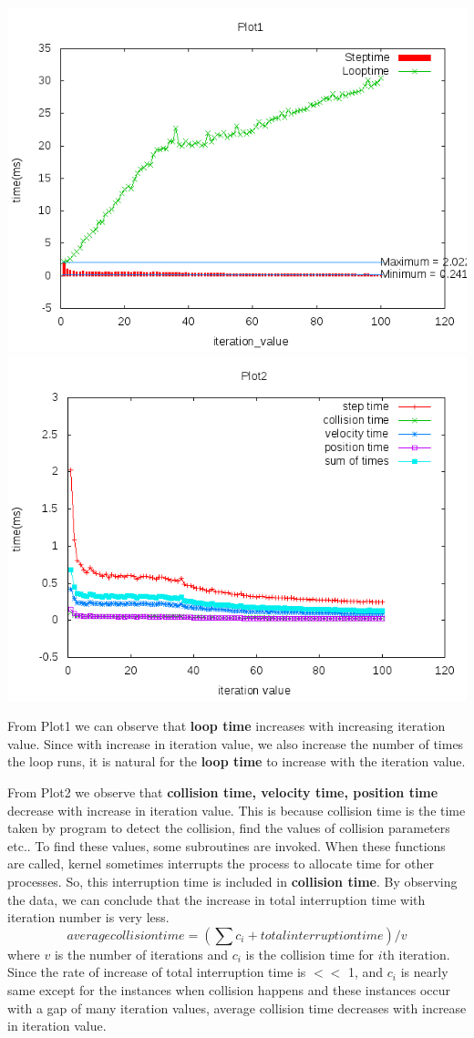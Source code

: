 \documentclass[11pt]{article}
\begin{document}
\includegraphics[scale=0.5]{g28_plot01.png}
\includegraphics[scale=0.5]{g28_plot02.png}

From Plot1 we can observe that {\bf loop time} increases with increasing iteration value. Since with increase in iteration value, we also increase the number of times the loop runs, it is natural for the {\bf loop time} to increase with the iteration value.

From Plot2 we observe that {\bf collision time, velocity time, position time} decrease with increase in iteration value. This is because collision time is the time taken by program to detect the collision, find the values of collision parameters etc.. To find these values, some subroutines are invoked. When these functions are called, kernel sometimes interrupts the process to allocate time for other processes. So, this interruption time is included in {\bf collision time}.  By observing the data, we can conclude that the increase in total interruption time with iteration number is very less.
$$average collision time = \left(\sum c_i +  total interruption time\right)/v$$ where $v$ is the number of iterations and $c_i$ is the collision time for $i$th iteration. Since the rate of increase of total interruption time  is $<<$ 1, and $c_i$ is nearly same except for the instances when collision happens and these instances occur with a gap of many iteration values, average collision time decreases with increase in iteration value.
 
\end{document}

